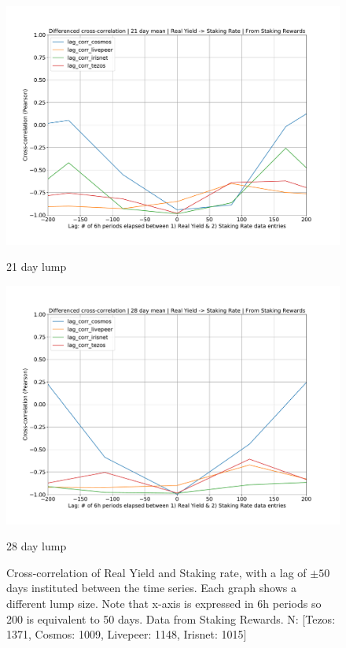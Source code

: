 \documentclass[longbibliography,nofootinbib]{revtex4-1}
\begin{document}
\begin{figure}
\begin{minipage}{0.5\textwidth}
        \includegraphics[width=1\textwidth]{graphs/CrossCorr_SR_DIF_21.pdf}
        \caption{21 day lump}
    \end{minipage}\hfill
    \begin{minipage}{0.5\textwidth}
        \centering
        \includegraphics[width=1\textwidth]{graphs/CrossCorr_SR_DIF_28.pdf}
        \caption{28 day lump}
    \end{minipage}
    \caption{Cross-correlation of Real Yield and Staking rate, with a lag of $\pm50$ days instituted between the time series. Each graph shows a different lump size. Note that x-axis is expressed in 6h periods so 200 is equivalent to 50 days. Data from Staking Rewards. N: [Tezos:  1371, Cosmos: 1009, Livepeer: 1148, Irisnet: 1015]}
\end{figure}
\end{document}
